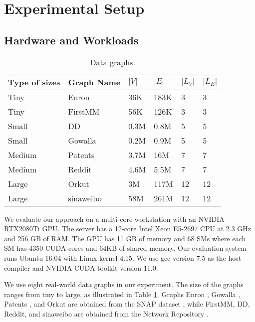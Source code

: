 \section{Experimental Setup}

\subsection{Hardware and Workloads}

\begin{table} [t!]
\centering
  \caption{Data graphs.}
  \label{tab:datagraph}
  \small
  \begin{tabular}{llllll}
  \toprule
    \textbf{Type of sizes}&\textbf{Graph Name} &$|V|$&$|E|$&$|L_V|$&$|L_E|$\\
    \midrule
    Tiny	&Enron		&36K	&183K	&3	&3 \\
    Tiny	&FirstMM 	&56K	&126K	&3	&3 \\
    Small	&DD			&0.3M	&0.8M	&5	&5\\
    Small	&Gowalla	&0.2M	&0.9M	&5	&5\\
    Medium	&Patents	&3.7M	&16M	&7	&7\\
    Medium	&Reddit		&4.6M	&5.5M	&7	&7\\
    Large	&Orkut		&3M		&117M	&12	&12\\
	Large	&sinaweibo	&58M	&261M	&12	&12\\

    \bottomrule
  \end{tabular}
\end{table}
 We evaluate our approach on a multi-core workstation with an NVIDIA RTX2080Ti GPU. The server has a
12-core Intel Xeon E5-2697 CPU at 2.3 GHz and 256 GB of RAM. The GPU has 11 GB of memory and 68 SMs where each SM has 4350 CUDA cores and
64KB of shared memory. Our evaluation system runs Ubuntu 16.04 with Linux kernel 4.15. We use gcc version 7.5 as the host compiler and
NVIDIA CUDA toolkit version 11.0. 

 We use eight real-world data graphs in our experiment. The size of the graphs ranges from tiny to large, as
illustrated in Table \ref{tab:datagraph}. Graphs Enron \cite{leskovec2009community}, Gowalla \cite{cho2011friendship}, Patents
\cite{leskovec2005graphs}, and Orkut \cite{yang2015defining} are obtained from the SNAP dataset \cite{snapnets}, while FirstMM, DD, Reddit,
and sinaweibo are obtained from the Network Repository \cite{ryan2015network,nr-sigkdd16}.

